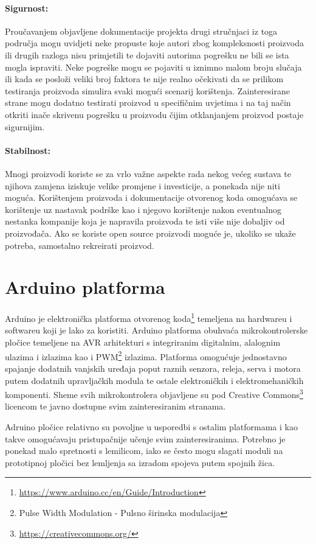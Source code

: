 \paragraph{Sigurnost:}
Proučavanjem objavljene dokumentacije projekta drugi stručnjaci iz toga područja mogu uvidjeti neke propuste koje autori zbog kompleksnosti proizvoda ili drugih razloga nisu primjetili te dojaviti autorima pogrešku ne bili se ista mogla ispraviti. 
Neke pogreške mogu se pojaviti u iznimno malom broju slučaja ili kada se posloži veliki broj faktora te nije realno očekivati da se prilikom testiranja proizvoda simulira svaki mogući scenarij korištenja.
Zainteresirane strane mogu dodatno testirati proizvod u specifičnim uvjetima i na taj način otkriti inače skrivenu pogrešku u proizvodu čijim otklanjanjem proizvod postaje sigurnijim.

\paragraph{Stabilnost:}
Mnogi proizvodi koriste se za vrlo važne aspekte rada nekog većeg sustava te njihova zamjena iziskuje velike promjene i investicije, a ponekada nije niti moguća.
Korištenjem proizvoda i dokumentacije otvorenog koda omogućava se korištenje uz nastavak podrške kao i njegovo korištenje nakon eventualnog nestanka kompanije koja je napravila proizvoda te isti više nije dobaljiv od proizvođača. 
Ako se koriste open source proizvodi moguće je, ukoliko se ukaže potreba, samostalno rekreirati proizvod.


\section{Arduino platforma}
Arduino je elektronička platforma otvorenog koda\footnote{\url{https://www.arduino.cc/en/Guide/Introduction}} temeljena na hardwareu i softwareu koji je lako za koristiti.
Arduino platforma obuhvaća mikrokontrolerske pločice temeljene na AVR arhitekturi s integriranim digitalnim, alalognim ulazima i izlazima kao i PWM\footnote{Pulse Width Modulation - Pulsno širinska modulacija} izlazima.
Platforma omogućuje jednostavno spajanje dodatnih vanjskih uređaja poput raznih senzora, releja, serva i motora putem dodatnih upravljačkih modula te ostale elektroničkih i elektromehaničkih komponenti.
Sheme svih mikrokontrolera objavljene su pod Creative Commons\footnote{\url{https://creativecommons.org/}} licencom te javno dostupne svim zainteresiranim stranama.

Adruino pločice relativno su povoljne u usporedbi s ostalim platformama i kao takve omogućavaju pristupačnije učenje svim zainteresiranima.
Potrebno je ponekad malo spretnosti s lemilicom, iako se često mogu slagati moduli na prototipnoj pločici bez lemljenja sa izradom spojeva putem spojnih žica.

